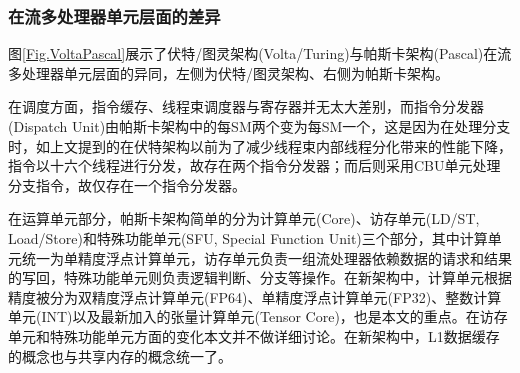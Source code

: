 \subsubsection{在流多处理器单元层面的差异}
\par 图\ref{Fig.VoltaPascal}展示了伏特/图灵架构(Volta/Turing)与帕斯卡架构(Pascal)在流多处理器单元层面的异同，左侧为伏特/图灵架构、右侧为帕斯卡架构。
\par 在调度方面，指令缓存、线程束调度器与寄存器并无太大差别，而指令分发器(Dispatch Unit)由帕斯卡架构中的每SM两个变为每SM一个，这是因为在处理分支时，如上文提到的在伏特架构以前为了减少线程束内部线程分化带来的性能下降，指令以十六个线程进行分发，故存在两个指令分发器；而后则采用CBU单元处理分支指令，故仅存在一个指令分发器。
\par 在运算单元部分，帕斯卡架构简单的分为计算单元(Core)、访存单元(LD/ST, Load/Store)和特殊功能单元(SFU, Special Function Unit)三个部分，其中计算单元统一为单精度浮点计算单元，访存单元负责一组流处理器依赖数据的请求和结果的写回，特殊功能单元则负责逻辑判断、分支等操作。在新架构中，计算单元根据精度被分为双精度浮点计算单元(FP64)、单精度浮点计算单元(FP32)、整数计算单元(INT)以及最新加入的张量计算单元(Tensor Core)，也是本文的重点。在访存单元和特殊功能单元方面的变化本文并不做详细讨论。在新架构中，L1数据缓存的概念也与共享内存的概念统一了。
